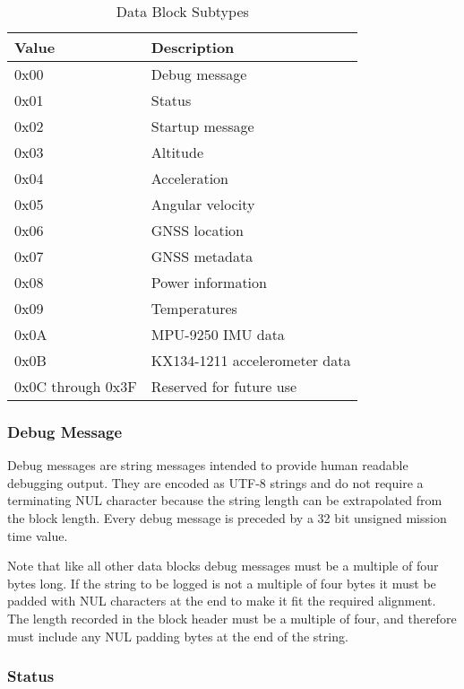 \begin{table*}[htb]
\centering
\begin{tabular}{@{}ll@{}}
\toprule
Value               &   Description \\
\midrule
0x00                &   Debug message \\
0x01                &   Status \\
0x02                &   Startup message \\
0x03                &   Altitude \\
0x04                &   Acceleration \\
0x05                &   Angular velocity \\
0x06                &   GNSS location \\
0x07                &   GNSS metadata \\
0x08                &   Power information \\
0x09                &   Temperatures \\
0x0A                &   MPU-9250 IMU data \\
0x0B                &   KX134-1211 accelerometer data \\
0x0C through 0x3F   &   Reserved for future use \\
\bottomrule
\end{tabular}
\caption{Data Block Subtypes}
\label{table:data-subtypes}
\end{table*}


\subsubsection{Debug Message}

Debug messages are string messages intended to provide human readable debugging
output. They are encoded as UTF-8 strings and do not require a terminating NUL
character because the string length can be extrapolated from the block length.
Every debug message is preceded by a 32 bit unsigned mission time value.

Note that like all other data blocks debug messages must be a multiple of four
bytes long. If the string to be logged is not a multiple of four bytes it must
be padded with NUL characters at the end to make it fit the required alignment.
The length recorded in the block header must be a multiple of four, and
therefore must include any NUL padding bytes at the end of the string.


\subsubsection{Status}


